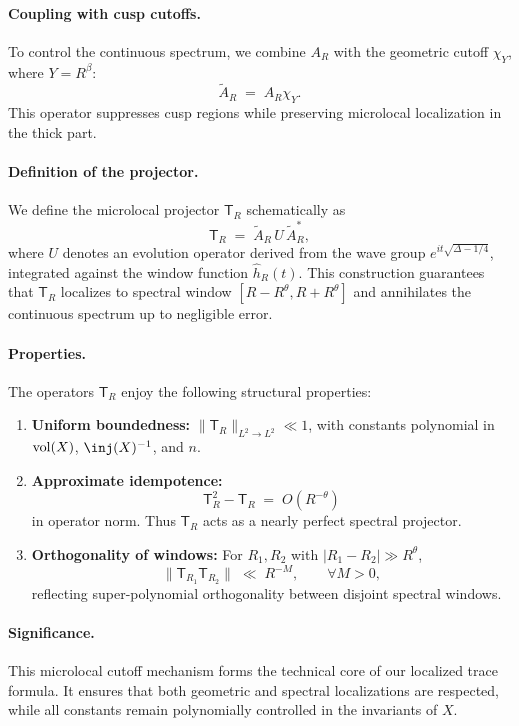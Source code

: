 \paragraph{Coupling with cusp cutoffs.}
To control the continuous spectrum, we combine $A_R$ with the geometric cutoff $\chi_Y$,
where $Y=R^\beta$:
\[
  \widetilde{A}_R \;=\; A_R \chi_Y.
\]
This operator suppresses cusp regions while preserving microlocal localization in the thick part.

\paragraph{Definition of the projector.}
We define the microlocal projector $\mathsf{T}_R$ schematically as
\[
  \mathsf{T}_R \;=\; \widetilde{A}_R \, U \, \widetilde{A}_R^*,
\]
where $U$ denotes an evolution operator derived from the wave group
$e^{it\sqrt{\Delta-1/4}}$, integrated against the window function $\widehat{h}_R(t)$.
This construction guarantees that $\mathsf{T}_R$ localizes to spectral window $[R-R^\theta,R+R^\theta]$
and annihilates the continuous spectrum up to negligible error.

\paragraph{Properties.}
The operators $\mathsf{T}_R$ enjoy the following structural properties:
\begin{enumerate}
  \item \textbf{Uniform boundedness:}  
        $\|\mathsf{T}_R\|_{L^2 \to L^2} \ll 1$, with constants polynomial in $\operatorname{vol}(X)$, $\inj(X)^{-1}$, and $n$.
  \item \textbf{Approximate idempotence:}  
        \[
          \mathsf{T}_R^2 - \mathsf{T}_R \;=\; O(R^{-\theta})
        \]
        in operator norm. Thus $\mathsf{T}_R$ acts as a nearly perfect spectral projector.
  \item \textbf{Orthogonality of windows:}  
        For $R_1,R_2$ with $|R_1-R_2|\gg R^\theta$,
        \[
          \|\mathsf{T}_{R_1}\mathsf{T}_{R_2}\| \;\ll\; R^{-M}, \qquad \forall M>0,
        \]
        reflecting super-polynomial orthogonality between disjoint spectral windows.
\end{enumerate}

\paragraph{Significance.}
This microlocal cutoff mechanism forms the technical core of our localized trace formula.
It ensures that both geometric and spectral localizations are respected,
while all constants remain polynomially controlled in the invariants of $X$.

